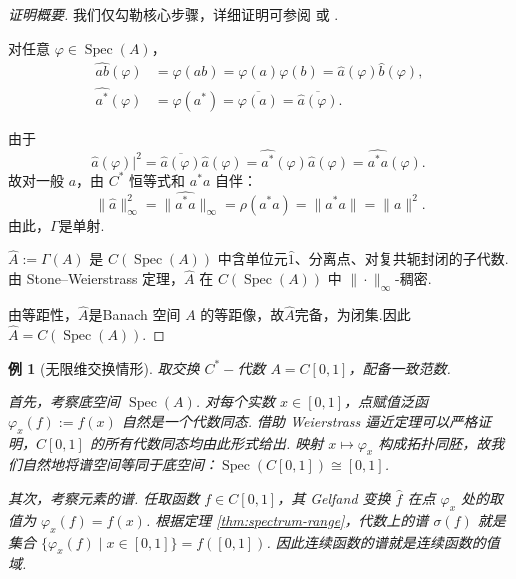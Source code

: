 \documentclass[math-font=lm, text-font=lm, math-style=TeX]{sjtureport}
\newtheorem{example}{例}[chapter]
\theoremstyle{plain}
\newtheorem*{proof}{证明}
\theoremstyle{plain}
\DeclareMathOperator{\Spec}{Spec}
\begin{document}
\begin{proof}[证明概要]
    我们仅勾勒核心步骤，详细证明可参阅 \cite{Murphy} 或 \cite{Davidson}.\par
     对任意 $\varphi \in \Spec(A)$，
    \begin{align}
        \widehat{ab}(\varphi) &= \varphi(ab) = \varphi(a)\varphi(b) = \widehat{a}(\varphi)\widehat{b}(\varphi), \\
        \widehat{a^*}(\varphi) &= \varphi(a^*) = \overline{\varphi(a)} = \overline{\widehat{a}(\varphi)}.
    \end{align}

     由于\begin{equation*}
    \widehat{a}(\varphi)|^2=\overline{\widehat{a}(\varphi)}\widehat{a}(\varphi)=\widehat{a^*}(\varphi)\widehat{a}(\varphi)=\widehat{a^*a}(\varphi).\
    \end{equation*}
    故对一般 $a$，由 $C^*$ 恒等式和 $a^*a$ 自伴：
    \[
      \|\widehat a\|_\infty^2
      =\|\widehat{a^*a}\|_\infty
      =\rho(a^*a)
      =\|a^*a\|
      =\|a\|^2.
    \]
    由此，$\Gamma$是单射.\par
     $\widehat{A}:=\Gamma(A)$ 是 $C(\Spec(A))$ 中含单位元$\hat{1}$、分离点、对复共轭封闭的子代数.由 Stone--Weierstrass 定理，$\widehat{A}$ 在 $C(\Spec(A))$ 中 $\|\cdot\|_\infty$-稠密.\par
    由等距性，$\widehat{A}$是Banach 空间 $A$ 的等距像，故$\widehat{A}$完备，为闭集.因此 $\widehat{A} = C(\Spec(A))$.
\end{proof}


\begin{example}[无限维交换情形]
    取交换 $C^*-\!$代数 $A = C[0,1]$，配备一致范数. \par
    首先，考察底空间 $\Spec(A)$. 对每个实数 $x \in [0,1]$，点赋值泛函 $\varphi_x(f) := f(x)$ 自然是一个代数同态. 借助 Weierstrass 逼近定理可以严格证明，$C[0,1]$ 的所有代数同态均由此形式给出. 映射 $x \mapsto \varphi_x$ 构成拓扑同胚，故我们自然地将谱空间等同于底空间：$\Spec(C[0,1]) \cong [0,1]$.
    
    其次，考察元素的谱. 任取函数 $f \in C[0,1]$，其 Gelfand 变换 $\widehat{f}$ 在点 $\varphi_x$ 处的取值为 $\varphi_x(f) = f(x)$. 根据定理 \ref{thm:spectrum-range}，代数上的谱 $\sigma(f)$ 就是集合 $\{\varphi_x(f) \mid x \in [0,1]\} = f([0,1])$. 因此连续函数的谱就是连续函数的值域.
\end{example}
\end{document}
